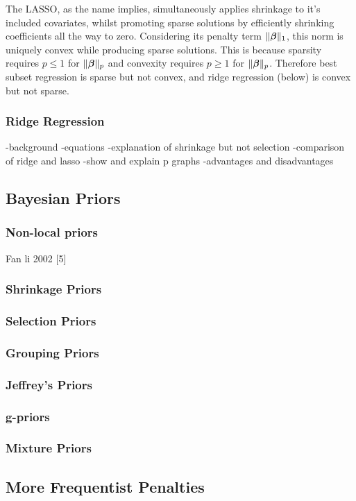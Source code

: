 The LASSO, as the name implies, simultaneously applies shrinkage to it's included covariates, whilst promoting sparse solutions by efficiently shrinking coefficients all the way to zero. Considering its penalty term $\Vert\boldsymbol{\beta}\Vert_1$, this norm is uniquely convex while producing sparse solutions. This is because sparsity requires $p\leq1$ for $\Vert\boldsymbol{\beta}\Vert_p$ and convexity requires $p\geq1$ for $\Vert\boldsymbol{\beta}\Vert_p$. Therefore best subset regression is sparse but not convex, and ridge regression (below) is convex but not sparse.

\subsubsection{Ridge Regression}

-background
-equations
-explanation of shrinkage but not selection
-comparison of ridge and lasso
-show and explain p graphs
-advantages and disadvantages

\subsection{Bayesian Priors}
\subsubsection{Non-local priors}
Fan li 2002 [5]
\subsubsection{Shrinkage Priors}
\subsubsection{Selection Priors}
\subsubsection{Grouping Priors}
\subsubsection{Jeffrey's Priors}
\subsubsection{g-priors}
\subsubsection{Mixture Priors}
\subsection{More Frequentist Penalties}
